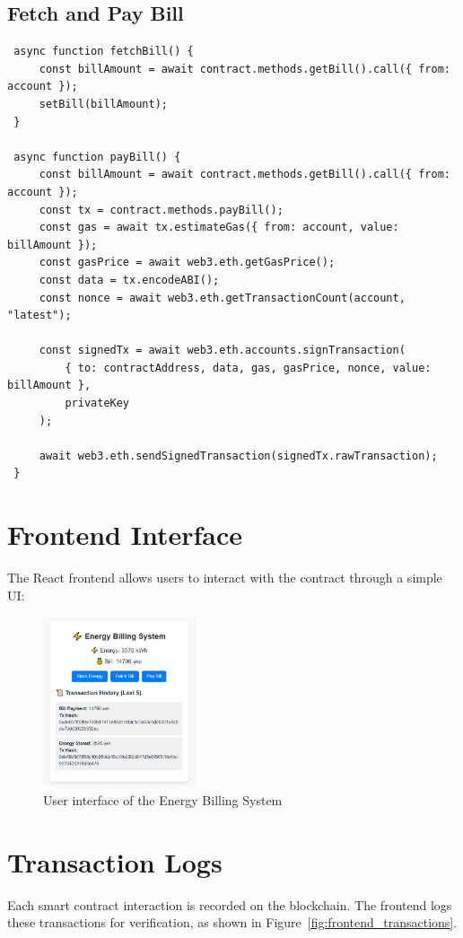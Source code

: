 \documentclass[a4paper,12pt]{report}
\begin{document}
 \subsection{Fetch and Pay Bill}
 \begin{lstlisting}
 async function fetchBill() {
     const billAmount = await contract.methods.getBill().call({ from: account });
     setBill(billAmount);
 }
 
 async function payBill() {
     const billAmount = await contract.methods.getBill().call({ from: account });
     const tx = contract.methods.payBill();
     const gas = await tx.estimateGas({ from: account, value: billAmount });
     const gasPrice = await web3.eth.getGasPrice();
     const data = tx.encodeABI();
     const nonce = await web3.eth.getTransactionCount(account, "latest");
 
     const signedTx = await web3.eth.accounts.signTransaction(
         { to: contractAddress, data, gas, gasPrice, nonce, value: billAmount },
         privateKey
     );
 
     await web3.eth.sendSignedTransaction(signedTx.rawTransaction);
 }
 \end{lstlisting}
 
 \section{Frontend Interface}
 The React frontend allows users to interact with the contract through a simple UI:
 
 \begin{figure}[H]
 \centering
 \includegraphics[width=0.4\textwidth]{web3 App.PNG}
 \caption{User interface of the Energy Billing System}
 \label{fig:frontend_ui}
 \end{figure}
 
 \section{Transaction Logs}
 Each smart contract interaction is recorded on the blockchain. The frontend logs these transactions for verification, as shown in Figure~\ref{fig:frontend_transactions}.
 
\end{document}
